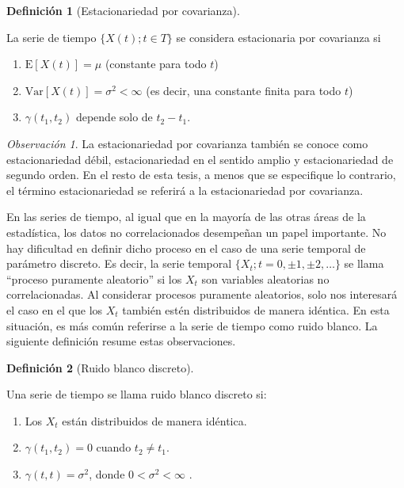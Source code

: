 \documentclass[
  letterpaper,
  DIV=11,
  numbers=noendperiod]{scrreport}
\theoremstyle{plain}
\theoremstyle{definition}
\newtheorem{definition}{Definición}[chapter]
\theoremstyle{definition}
\theoremstyle{plain}
\theoremstyle{remark}
\newtheorem*{remark}{Observación}
\begin{document}
\begin{definition}[Estacionariedad por
covarianza]\protect\hypertarget{def-estcov}{}\label{def-estcov}

La serie de tiempo \(\{X(t); t \in T\}\) se considera estacionaria por
covarianza si

\begin{enumerate}
\def\labelenumi{\arabic{enumi}.}
\item
  \(\mathrm E[X(t)] = \mu\) (constante para todo \(t\))
\item
  \(\mathrm{Var}[X(t)] = \sigma^2 < \infty\) (es decir, una constante
  finita para todo \(t\))
\item
  \(\gamma (t_1, t_2)\) depende solo de \(t_2 − t_1\).
\end{enumerate}

\end{definition}

\begin{remark}
La estacionariedad por covarianza también se conoce como estacionariedad
débil, estacionariedad en el sentido amplio y estacionariedad de segundo
orden. En el resto de esta tesis, a menos que se especifique lo
contrario, el término estacionariedad se referirá a la estacionariedad
por covarianza.
\end{remark}

En las series de tiempo, al igual que en la mayoría de las otras áreas
de la estadística, los datos no correlacionados desempeñan un papel
importante. No hay dificultad en definir dicho proceso en el caso de una
serie temporal de parámetro discreto. Es decir, la serie temporal
\(\{X_t; t = 0, \pm 1, \pm 2,\ldots\}\) se llama ``proceso puramente
aleatorio'' si los \(X_t\) son variables aleatorias no correlacionadas.
Al considerar procesos puramente aleatorios, solo nos interesará el caso
en el que los \(X_t\) también estén distribuidos de manera idéntica. En
esta situación, es más común referirse a la serie de tiempo como ruido
blanco. La siguiente definición resume estas observaciones.

\begin{definition}[Ruido blanco
discreto]\protect\hypertarget{def-ruidob}{}\label{def-ruidob}

Una serie de tiempo se llama ruido blanco discreto si:

\begin{enumerate}
\def\labelenumi{\arabic{enumi}.}
\item
  Los \(X_t\) están distribuidos de manera idéntica.
\item
  \(\gamma (t_1, t_2) = 0\) cuando \(t_2 \ne t_1\).
\item
  \(\gamma (t, t) = \sigma^2\), donde \(0 < \sigma^2 < \infty\) .
\end{enumerate}

\end{definition}
\end{document}
